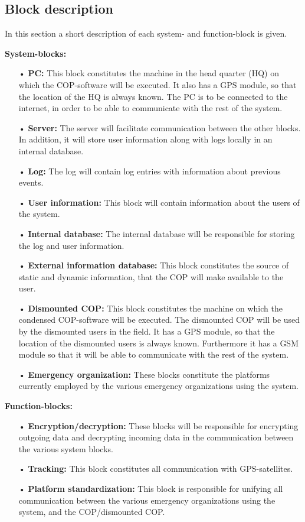\subsection{Block description}
In this section a short description of each system- and function-block is given.

\textbf{System-blocks:}
\begin{enumerate}
\item[•] \textbf{PC:} This block constitutes the machine in the head quarter (HQ) on which the COP-software will be executed. It also has a GPS module, so that the location of the HQ is always known. The PC is to be connected to the internet, in order to be able to communicate with the rest of the system.
\item[•] \textbf{Server:} The server will facilitate communication between the other blocks. In addition, it will store user information along with logs locally in an internal database.
\item[•] \textbf{Log:} The log will contain log entries with information about previous events.
\item[•] \textbf{User information:} This block will contain information about the users of the system.
\item[•] \textbf{Internal database:} The internal database will be responsible for storing the log and user information.
\item[•] \textbf{External information database:} This block constitutes the source of static and dynamic information, that the COP will make available to the user.
\item[•] \textbf{Dismounted COP:} This block constitutes the machine on which the condensed COP-software will be executed. The dismounted COP will be used by the dismounted users in the field. It has a GPS module, so that the location of the dismounted users is always known. Furthermore it has a GSM module so that it will be able to communicate with the rest of the system.
\item[•] \textbf{Emergency organization:} These blocks constitute the platforms currently employed by the various emergency organizations using the system.
\end{enumerate}


\textbf{Function-blocks:}
\begin{enumerate}
\item[•] \textbf{Encryption/decryption:} These blocks will be responsible for encrypting outgoing data and decrypting incoming data in the communication between the various system blocks.
\item[•] \textbf{Tracking:} This block constitutes all communication with GPS-satellites.
\item[•] \textbf{Platform standardization:} This block is responsible for unifying all communication between the various emergency organizations using the system, and the COP/dismounted COP.
\end{enumerate}

